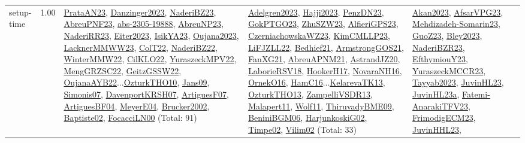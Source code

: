 {\begin{longtable}{p{3cm}r>{\raggedright\arraybackslash}p{6cm}>{\raggedright\arraybackslash}p{6cm}>{\raggedright\arraybackslash}p{8cm}}
\index{setup-time}\index{Concepts!setup-time}setup-time &  1.00 & \hyperref[detail:PrataAN23]{PrataAN23}, \hyperref[detail:Danzinger2023]{Danzinger2023}, \hyperref[detail:NaderiBZ23]{NaderiBZ23}, \hyperref[detail:AbreuPNF23]{AbreuPNF23}, \hyperref[detail:abs-2305-19888]{abs-2305-19888}, \hyperref[detail:AbreuNP23]{AbreuNP23}, \hyperref[detail:NaderiRR23]{NaderiRR23}, \hyperref[detail:Eiter2023]{Eiter2023}, \hyperref[detail:IsikYA23]{IsikYA23}, \hyperref[detail:Oujana2023]{Oujana2023}, \hyperref[detail:LacknerMMWW23]{LacknerMMWW23}, \hyperref[detail:ColT22]{ColT22}, \hyperref[detail:NaderiBZ22]{NaderiBZ22}, \hyperref[detail:WinterMMW22]{WinterMMW22}, \hyperref[detail:CilKLO22]{CilKLO22}, \hyperref[detail:YuraszeckMPV22]{YuraszeckMPV22}, \hyperref[detail:MengGRZSC22]{MengGRZSC22}, \hyperref[detail:GeitzGSSW22]{GeitzGSSW22}, \hyperref[detail:OujanaAYB22]{OujanaAYB22}...\hyperref[detail:OzturkTHO10]{OzturkTHO10}, \hyperref[detail:Jans09]{Jans09}, \hyperref[detail:Simonis07]{Simonis07}, \hyperref[detail:DavenportKRSH07]{DavenportKRSH07}, \hyperref[detail:ArtiguesF07]{ArtiguesF07}, \hyperref[detail:ArtiguesBF04]{ArtiguesBF04}, \hyperref[detail:MeyerE04]{MeyerE04}, \hyperref[detail:Brucker2002]{Brucker2002}, \hyperref[detail:Baptiste02]{Baptiste02}, \hyperref[detail:FocacciLN00]{FocacciLN00} (Total: 91) & \hyperref[detail:Adelgren2023]{Adelgren2023}, \hyperref[detail:Hajji2023]{Hajji2023}, \hyperref[detail:PenzDN23]{PenzDN23}, \hyperref[detail:GokPTGO23]{GokPTGO23}, \hyperref[detail:ZhuSZW23]{ZhuSZW23}, \hyperref[detail:AlfieriGPS23]{AlfieriGPS23}, \hyperref[detail:CzerniachowskaWZ23]{CzerniachowskaWZ23}, \hyperref[detail:KimCMLLP23]{KimCMLLP23}, \hyperref[detail:LiFJZLL22]{LiFJZLL22}, \hyperref[detail:Bedhief21]{Bedhief21}, \hyperref[detail:ArmstrongGOS21]{ArmstrongGOS21}, \hyperref[detail:FanXG21]{FanXG21}, \hyperref[detail:AbreuAPNM21]{AbreuAPNM21}, \hyperref[detail:AstrandJZ20]{AstrandJZ20}, \hyperref[detail:LaborieRSV18]{LaborieRSV18}, \hyperref[detail:HookerH17]{HookerH17}, \hyperref[detail:NovaraNH16]{NovaraNH16}, \hyperref[detail:OrnekO16]{OrnekO16}, \hyperref[detail:HamC16]{HamC16}...\hyperref[detail:KelarevaTK13]{KelarevaTK13}, \hyperref[detail:OzturkTHO13]{OzturkTHO13}, \hyperref[detail:ZampelliVSDR13]{ZampelliVSDR13}, \hyperref[detail:Malapert11]{Malapert11}, \hyperref[detail:Wolf11]{Wolf11}, \hyperref[detail:ThiruvadyBME09]{ThiruvadyBME09}, \hyperref[detail:BeniniBGM06]{BeniniBGM06}, \hyperref[detail:HarjunkoskiG02]{HarjunkoskiG02}, \hyperref[detail:Timpe02]{Timpe02}, \hyperref[detail:Vilim02]{Vilim02} (Total: 33) & \hyperref[detail:Akan2023]{Akan2023}, \hyperref[detail:AfsarVPG23]{AfsarVPG23}, \hyperref[detail:Mehdizadeh-Somarin23]{Mehdizadeh-Somarin23}, \hyperref[detail:GuoZ23]{GuoZ23}, \hyperref[detail:Bley2023]{Bley2023}, \hyperref[detail:NaderiBZR23]{NaderiBZR23}, \hyperref[detail:EfthymiouY23]{EfthymiouY23}, \hyperref[detail:YuraszeckMCCR23]{YuraszeckMCCR23}, \hyperref[detail:Tayyab2023]{Tayyab2023}, \hyperref[detail:JuvinHL23]{JuvinHL23}, \hyperref[detail:JuvinHL23a]{JuvinHL23a}, \hyperref[detail:Fatemi-AnarakiTFV23]{Fatemi-AnarakiTFV23}, \hyperref[detail:FrimodigECM23]{FrimodigECM23}, \hyperref[detail:JuvinHHL23]{JuvinHHL23}, 
\end{longtable}}

